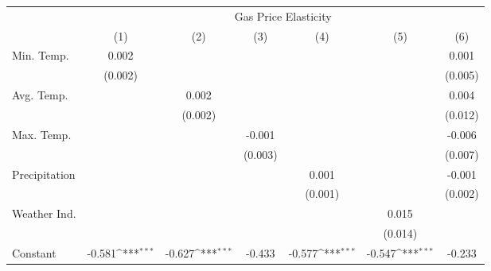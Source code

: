 {
\def\sym#1{\ifmmode^{#1}\else\(^{#1}\)\fi}
\begin{tabular}{l*{6}{c}}
\hline\hline
            &\multicolumn{6}{c}{Gas Price Elasticity}                                                                                           \\
            &\multicolumn{1}{c}{(1)}         &\multicolumn{1}{c}{(2)}         &\multicolumn{1}{c}{(3)}         &\multicolumn{1}{c}{(4)}         &\multicolumn{1}{c}{(5)}         &\multicolumn{1}{c}{(6)}         \\
\hline
Min. Temp.  &       0.002         &                     &                     &                     &                     &       0.001         \\
            &     (0.002)         &                     &                     &                     &                     &     (0.005)         \\
[1em]
Avg. Temp.  &                     &       0.002         &                     &                     &                     &       0.004         \\
            &                     &     (0.002)         &                     &                     &                     &     (0.012)         \\
[1em]
Max. Temp.  &                     &                     &      -0.001         &                     &                     &      -0.006         \\
            &                     &                     &     (0.003)         &                     &                     &     (0.007)         \\
[1em]
Precipitation&                     &                     &                     &       0.001         &                     &      -0.001         \\
            &                     &                     &                     &     (0.001)         &                     &     (0.002)         \\
[1em]
Weather Ind.&                     &                     &                     &                     &       0.015         &                     \\
            &                     &                     &                     &                     &     (0.014)         &                     \\
[1em]
Constant    &      -0.581\sym{***}&      -0.627\sym{***}&      -0.433         &      -0.577\sym{***}&      -0.547\sym{***}&      -0.233         \\

\end{tabular}}
